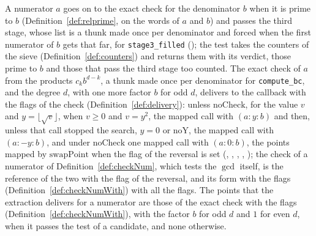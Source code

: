 \begin{definition}\label{def:accepted}
  \leanok
  A numerator $a$ goes on to the exact check for the denominator $b$ when it is prime to $b$
  (Definition~\ref{def:relprime}, on the words of $a$ and $b$) and passes the third stage, whose
  list is a thunk made once per denominator and forced when the first numerator of $b$ gets that
  far, for \verb|stage3_filled| (); the test takes the counters of the
  sieve (Definition~\ref{def:counters}) and returns them with its verdict, those prime to $b$ and
  those that pass the third stage too counted. The exact check of $a$ from the products
  $c_k b^{d - k}$, a thunk made once per denominator for \verb|compute_bc|, and the degree $d$, with
  one more factor $b$ for odd $d$, delivers to the callback with the flags of the check
  (Definition~\ref{def:delivery}): unless $\mathrm{noCheck}$, for the value $v$ and
  $y = \lfloor \sqrt{v} \rfloor$, when $v \ge 0$ and $v = y^2$, the mapped call with $(a : y : b)$
  and then, unless that call stopped the search, $y = 0$ or $\mathrm{noY}$, the mapped call with
  $(a : -y : b)$, and under $\mathrm{noCheck}$ one mapped call with $(a : 0 : b)$, the points mapped
  by $\mathrm{swapPoint}$ when the flag of the reversal is set (,
  , ,
  , ); the check of a numerator of
  Definition~\ref{def:checkNum}, which tests the $\gcd$ itself, is the reference of the two with the
  flag of the reversal, and its form with the flags (Definition~\ref{def:checkNumWith}) with all the
  flags. The points that the extraction delivers for a numerator are those of the exact check with
  the flags (Definition~\ref{def:checkNumWith}), with the factor $b$ for odd $d$ and $1$ for even
  $d$, when it passes the test of a candidate, and none otherwise.
\end{definition}

